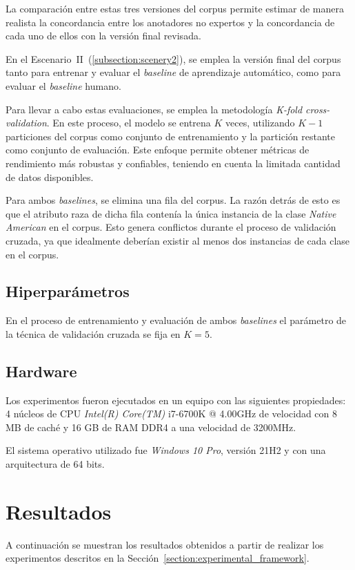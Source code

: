 La comparaci\'on entre estas tres versiones del corpus permite estimar de manera realista la concordancia entre los anotadores 
no expertos y la concordancia de cada uno de ellos con la versi\'on final revisada. 

En el Escenario~II~(\ref{subsection:scenery2}), se emplea la versi\'on final del corpus tanto para entrenar y evaluar el 
\emph{baseline} de aprendizaje autom\'atico, como para evaluar el \emph{baseline} humano.

Para llevar a cabo estas evaluaciones, se emplea la 
metodolog\'ia \emph{K-fold cross-validation}. En este proceso, el modelo se entrena $K$ veces, utilizando 
$K-1$ particiones del corpus como conjunto de entrenamiento y la partici\'on restante como conjunto de evaluaci\'on.
Este enfoque permite obtener m\'etricas de rendimiento m\'as robustas y confiables, teniendo en cuenta 
la limitada cantidad de datos disponibles.

Para ambos \emph{baselines}, se elimina una fila del corpus. La raz\'on detr\'as de esto es que el atributo raza de dicha 
fila conten\'ia la \'unica instancia de la clase \emph{Native American} en el corpus. 
Esto genera conflictos durante el proceso de validaci\'on cruzada, ya que idealmente deber\'ian existir al menos dos 
instancias de cada clase en el corpus.

\subsection{Hiperpar\'ametros}
En el proceso de entrenamiento y evaluaci\'on de ambos \emph{baselines} el par\'ametro de la t\'ecnica de validaci\'on
cruzada se fija en $K=5$. 

\subsection{Hardware}
Los experimentos fueron ejecutados en un equipo con las siguientes propiedades: 4 n\'ucleos de CPU \emph{Intel(R) Core(TM)} i7-6700K
@ 4.00GHz de velocidad con 8 MB de cach\'e y 16 GB de RAM DDR4 a una velocidad de 3200MHz.

El sistema operativo utilizado fue \emph{Windows 10 Pro}, versi\'on 21H2 y con una arquitectura de 64 bits.

\section{Resultados}\label{section:results}
A continuaci\'on se muestran los resultados obtenidos a partir de realizar los experimentos descritos en la 
Secci\'on~\ref{section:experimental_framework}.

